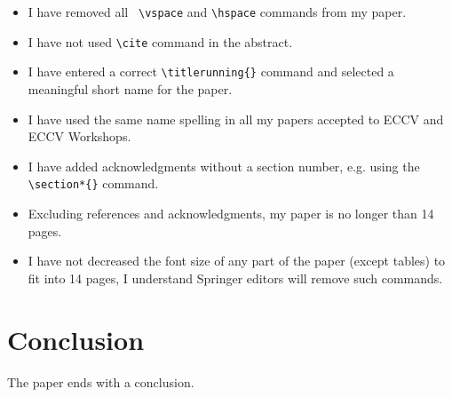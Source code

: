 \documentclass[runningheads]{llncs}
\begin{document}
\begin{itemize}
\item I have removed all \verb| \vspace| and \verb|\hspace|  commands from my paper.
\item I have not used \verb|\cite| command in the abstract.
\item I have entered a correct \verb|\titlerunning{}| command and selected a meaningful short name for the paper.
\item I have used the same name spelling in all my papers accepted to ECCV and ECCV Workshops.
\item I have added acknowledgments without a section number, e.g. using the \verb|\section*{}| command.
\item Excluding references and acknowledgments, my paper is no longer than 14 pages.
\item I have not decreased the font size of any part of the paper (except tables) to fit into 14 pages, I understand Springer editors will remove such commands.
\end{itemize}


\section{Conclusion}
The paper ends with a conclusion. 
\end{document}
